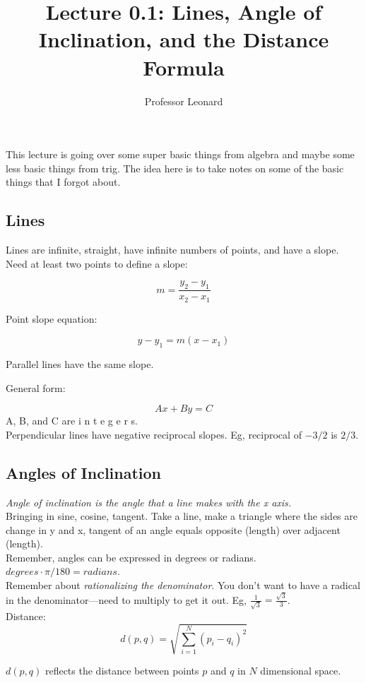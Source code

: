 \documentclass{article}
\begin{document}
\title{Lecture 0.1: Lines, Angle of Inclination, and the Distance Formula}
\author{Professor Leonard}
\maketitle

This lecture is going over some super basic things from algebra and maybe some less basic
things from trig. The idea here is to take notes on some of the basic things that I forgot
about.


\subsection{Lines}
Lines are infinite, straight, have infinite numbers of points, and have a slope. Need at
least two points to define a slope:

\begin{equation}
    m = \frac{y_2 - y_1}{x_2 - x_1}
\end{equation}

Point slope equation:

\begin{equation}
    y - y_1 = m(x - x_1)
\end{equation}

Parallel lines have the same slope.

General form: 

\begin{equation}
    Ax + By = C
\end{equation}
A, B, and C are i n t e g e r s.\\

Perpendicular lines have negative reciprocal slopes. Eg, reciprocal of $-3/2$ is $2/3$.

\subsection{Angles of Inclination}

\textit{Angle of inclination is the angle that a line makes with the x axis.}\\

Bringing in sine, cosine, tangent. Take a line, make a triangle where the sides are change
in y and x, tangent of an angle equals opposite (length) over adjacent (length).\\

Remember, angles can be expressed in degrees or radians. $degrees \cdot \pi/180 =
radians$.\\

Remember about \textit{rationalizing the denominator}. You don't want to have a radical in
the denominator---need to multiply to get it out. Eg, $\frac{1}{\sqrt{3}} =
\frac{\sqrt{3}}{3}$.\\

Distance:\\

\begin{equation}
    d(p,q) = \sqrt{\sum_{i=1}^{N}{(p_i - q_i)^2}}
\end{equation}

$d(p,q)$ reflects the distance between points $p$ and $q$ in $N$ dimensional space.
\end{document}
